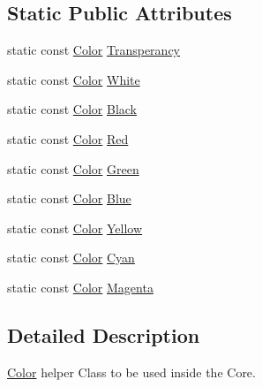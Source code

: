 \subsection*{Static Public Attributes}
\begin{DoxyCompactItemize}
\item 
static const \hyperlink{classZeta_1_1Color}{Color} \hyperlink{classZeta_1_1Color_a07cd49e6ad69b3581321718e2ae31086}{Transperancy}
\item 
static const \hyperlink{classZeta_1_1Color}{Color} \hyperlink{classZeta_1_1Color_a58b9e675ed8534eaf2463cf73000d18a}{White}
\item 
static const \hyperlink{classZeta_1_1Color}{Color} \hyperlink{classZeta_1_1Color_a4a6a583730b56c02ac6eac1f75d29895}{Black}
\item 
static const \hyperlink{classZeta_1_1Color}{Color} \hyperlink{classZeta_1_1Color_acaedffbab8412fba2b45a475acae85ba}{Red}
\item 
static const \hyperlink{classZeta_1_1Color}{Color} \hyperlink{classZeta_1_1Color_aa32c920f12466da2c4e34eed06330f3d}{Green}
\item 
static const \hyperlink{classZeta_1_1Color}{Color} \hyperlink{classZeta_1_1Color_afd1ab70350452370df5d4588ae84282b}{Blue}
\item 
static const \hyperlink{classZeta_1_1Color}{Color} \hyperlink{classZeta_1_1Color_a0761150a2e61ee142822f4ac99a3e0bb}{Yellow}
\item 
static const \hyperlink{classZeta_1_1Color}{Color} \hyperlink{classZeta_1_1Color_a59a0124f868c4d4e93dd11d3c3cb560c}{Cyan}
\item 
static const \hyperlink{classZeta_1_1Color}{Color} \hyperlink{classZeta_1_1Color_a30ea5a81617f7067293385af6e5c0958}{Magenta}
\end{DoxyCompactItemize}


\subsection{Detailed Description}
\hyperlink{classZeta_1_1Color}{Color} helper Class to be used inside the Core. 

